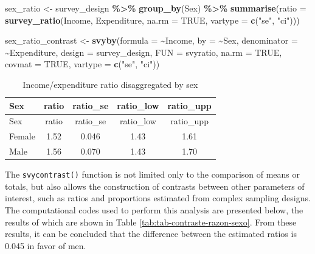 \documentclass[
  english,
  12pt,
]{book}
\newenvironment{Shaded}{\begin{snugshade}}{\end{snugshade}}
\newcommand{\AttributeTok}[1]{\textcolor[rgb]{0.13,0.29,0.53}{#1}}
\newcommand{\ConstantTok}[1]{\textcolor[rgb]{0.56,0.35,0.01}{#1}}
\newcommand{\FunctionTok}[1]{\textcolor[rgb]{0.13,0.29,0.53}{\textbf{#1}}}
\newcommand{\NormalTok}[1]{#1}
\newcommand{\OtherTok}[1]{\textcolor[rgb]{0.56,0.35,0.01}{#1}}
\newcommand{\SpecialCharTok}[1]{\textcolor[rgb]{0.81,0.36,0.00}{\textbf{#1}}}
\newcommand{\StringTok}[1]{\textcolor[rgb]{0.31,0.60,0.02}{#1}}
\begin{document}
\begin{Shaded}
\begin{Highlighting}[]
\NormalTok{sex\_ratio }\OtherTok{\textless{}{-}}\NormalTok{ survey\_design }\SpecialCharTok{\%\textgreater{}\%}
  \FunctionTok{group\_by}\NormalTok{(Sex) }\SpecialCharTok{\%\textgreater{}\%}
  \FunctionTok{summarise}\NormalTok{(}\AttributeTok{ratio =} \FunctionTok{survey\_ratio}\NormalTok{(Income,}
\NormalTok{                                 Expenditure,}
                                 \AttributeTok{na.rm =} \ConstantTok{TRUE}\NormalTok{,}
                                 \AttributeTok{vartype =} \FunctionTok{c}\NormalTok{(}\StringTok{"se"}\NormalTok{, }\StringTok{"ci"}\NormalTok{)))}

\NormalTok{sex\_ratio\_contrast }\OtherTok{\textless{}{-}} \FunctionTok{svyby}\NormalTok{(}\AttributeTok{formula =} \SpecialCharTok{\textasciitilde{}}\NormalTok{Income,}
                            \AttributeTok{by =} \SpecialCharTok{\textasciitilde{}}\NormalTok{Sex,}
                            \AttributeTok{denominator =} \SpecialCharTok{\textasciitilde{}}\NormalTok{Expenditure,}
                            \AttributeTok{design =}\NormalTok{ survey\_design,}
                            \AttributeTok{FUN =}\NormalTok{ svyratio,}
                            \AttributeTok{na.rm =} \ConstantTok{TRUE}\NormalTok{,}
                            \AttributeTok{covmat =} \ConstantTok{TRUE}\NormalTok{,}
                            \AttributeTok{vartype =} \FunctionTok{c}\NormalTok{(}\StringTok{"se"}\NormalTok{, }\StringTok{"ci"}\NormalTok{))}
\end{Highlighting}
\end{Shaded}

\begin{longtable}[]{@{}lcccc@{}}
\caption{\label{tab:tab-razon-ingreso-gasto-sexo}Income/expenditure ratio disaggregated by sex}\tabularnewline
\toprule\noalign{}
Sex & ratio & ratio\_se & ratio\_low & ratio\_upp \\
\midrule\noalign{}
\endfirsthead
\toprule\noalign{}
Sex & ratio & ratio\_se & ratio\_low & ratio\_upp \\
\midrule\noalign{}
\endhead
\bottomrule\noalign{}
\endlastfoot
Female & 1.52 & 0.046 & 1.43 & 1.61 \\
Male & 1.56 & 0.070 & 1.43 & 1.70 \\
\end{longtable}

The \texttt{svycontrast()} function is not limited only to the comparison of means or totals, but also allows the construction of contrasts between other parameters of interest, such as ratios and proportions estimated from complex sampling designs. The computational codes used to perform this analysis are presented below, the results of which are shown in Table \ref{tab:tab-contraste-razon-sexo}. From these results, it can be concluded that the difference between the estimated ratios is 0.045 in favor of men.
\end{document}
